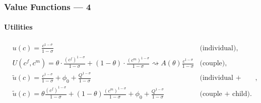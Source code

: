 \documentclass{beamer}
\begin{document}
\begin{frame}[label=value-functions]
\frametitle{Value Functions --- 4}
\framesubtitle{Utilities}
\hspace{-2em}
{\scriptsize
\begin{align*}
 & u(c) = \frac{c^{1-\sigma}}{1-\sigma}  & \text{(individual)},\\
 & U(c^f,c^m) = \theta\cdot \frac{(c^f)^{1-\sigma}}{1-\sigma} + (1-\theta)\cdot \frac{(c^m)^{1-\sigma}}{1-\sigma} \rightsquigarrow A(\theta) \frac{c^{1-\sigma}}{1-\sigma}  & \text{(couple)},                 \\
 & \tilde{u}(c) = \frac{c^{1-\sigma}}{1-\sigma}  + \phi_0 + \frac{Q^{1-\sigma}}{1-\sigma} & \text{(individual + child)},\\
 & \tilde{u}(c) = \theta \frac{(c^f)^{1-\sigma}}{1-\sigma}  +(1- \theta) \frac{(c^m)^{1-\sigma}}{1-\sigma}  + \phi_0 + \frac{Q^{1-\sigma}}{1-\sigma} & \text{(couple + child)}.
\end{align*}
}
\hyperlink{utilities}{}
\end{frame}
\end{document}
